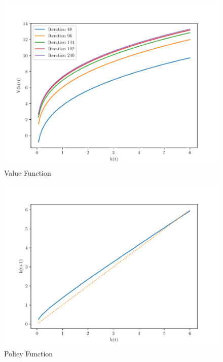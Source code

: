 \documentclass[11pt,a4paper]{book}
\theoremstyle{definition}\newtheorem{definition}{Definition}
\theoremstyle{definition}\newtheorem{fact}{Fact}
\theoremstyle{definition}\newtheorem{remark}{Remark}
\theoremstyle{definition}\newtheorem{ex}{Ex.}
\theoremstyle{definition}\newtheorem{project}{Project}
\theoremstyle{definition}\newtheorem{problem}{Problem}
\theoremstyle{definition}\newtheorem{example}{Example}
\numberwithin{theorem}{section}
\numberwithin{corollary}{chapter}
\numberwithin{assumption}{chapter}
\numberwithin{definition}{chapter}
\numberwithin{prop}{chapter}
\numberwithin{notation}{chapter}
\numberwithin{problem}{chapter}
\numberwithin{example}{chapter}
\numberwithin{fact}{chapter}
\numberwithin{ex}{chapter}
\begin{document}
	\begin{figure}[ht]
		\centering
		\includegraphics[scale=0.6]{valuefun.pdf}
		\caption{Value Function}
	\end{figure}
	
	\begin{figure}[ht]
		\centering
		\includegraphics[scale=0.6]{policyfun.pdf}
		\caption{Policy Function}
	\end{figure}
	
\end{document}

